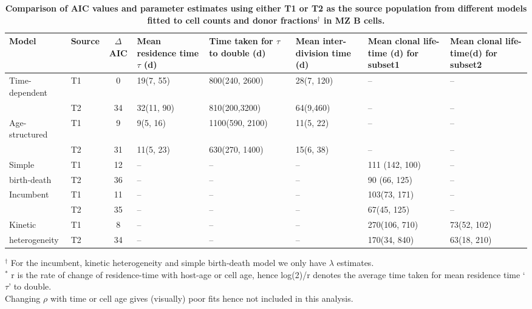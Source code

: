 \documentclass[11pt]{article}
\begin{document}
\begin{table}[h!]
	\small{
		\begin{center}
			\renewcommand{\arraystretch}{1.25}
			\begin{tabular}{ l | m{1.2cm} | c | m{2cm} | m{2cm} | m{2cm} | m{2cm} | m{2cm}} 
				\toprule[0.05cm]
				\textbf{Model} & \textbf{Source}  & \textbf{$\Delta$AIC} & \textbf{Mean residence time $\tau$ (d)}  & \textbf{Time taken for $\tau$ to double (d)}  & \textbf{Mean inter-division time (d)} & \textbf{Mean clonal life-time (d) for subset1} & \textbf{Mean clonal life-time(d) for subset2} \\
				\hline
				Time-dependent & T1 & 0   & 19(7, 55)  & 800(240, 2600)  & 28(7, 120)  &  --  & -- \\
				               & T2 & 34  & 32(11, 90) & 810(200,3200)   & 64(9,460)   &  --  & -- \\  
				\hline
				Age-structured & T1 & 9    & 9(5, 16)  & 1100(590, 2100)  & 11(5, 22)  &  --  & -- \\
				               & T2 & 31   & 11(5, 23) & 630(270, 1400)   & 15(6, 38)  &  --  & -- \\  
				\hline
				Simple         & T1 & 12   & -- & --  &  -- & 111 (142, 100)  & -- \\
				birth-death    & T2 & 36   & -- & --  &  -- & 90 (66, 125)    & -- \\  
				\hline
				Incumbent      & T1 & 11   & -- & --  &  -- & 103(73, 171)    & -- \\
				               & T2 & 35   & -- & --  &  -- & 67(45, 125)     & -- \\  
				\hline
				Kinetic        & T1 & 8    & -- & --  &  -- & 270(106, 710)   & 73(52, 102)  \\
				heterogeneity  & T2 & 34   & -- & --  &  -- & 170(34, 840)    & 63(18, 210)  \\  
				\hline
				\toprule 
			\end{tabular}
		\end{center}
		\caption{\small \textbf{Comparison of AIC values and parameter estimates using either T1 or T2 as the source population from different models fitted to cell counts and donor fractions$^{\dagger}$ in MZ B cells.}}
		$^{\dagger}$ \footnotesize For the incumbent, kinetic heterogeneity and simple birth-death model we only have $\lambda$ estimates. \\
		$^\ast$ \footnotesize r is the rate of change of residence-time with host-age or cell age, hence log(2)/r denotes the average time taken for mean residence time `$\tau$' to double. \\ Changing $\rho$ with time or cell age gives (visually) poor fits hence not included in this analysis. \\
		\label{tab:MZs_extended}
	}
\end{table} 
\end{document}
